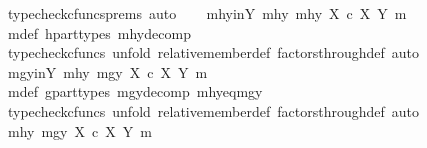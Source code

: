 \begin{isabellebody}
\ {\isacharparenleft}{\kern0pt}typecheck{\isacharunderscore}{\kern0pt}cfuncs{\isacharunderscore}{\kern0pt}prems{\isacharcomma}{\kern0pt}\ auto{\isacharparenright}{\kern0pt}\isanewline
\isanewline
\ \ \isamarkupfalse%
\ mhy{\isacharunderscore}{\kern0pt}in{\isacharunderscore}{\kern0pt}Y{\isacharcolon}{\kern0pt}\ {\isachardoublequoteopen}{\isasymlangle}mhy{}{\isacharcomma}{\kern0pt}\ mhy{}{\isasymrangle}\ {\isasymin}\isactrlbsub X\ {\isasymtimes}\isactrlsub c\ X\isactrlesub \ {\isacharparenleft}{\kern0pt}Y{\isacharcomma}{\kern0pt}\ m{\isacharparenright}{\kern0pt}{\isachardoublequoteclose}\isanewline
\ \ \ \ \isamarkupfalse%
\ m{\isacharunderscore}{\kern0pt}def\ h{\isacharunderscore}{\kern0pt}part{\isacharunderscore}{\kern0pt}types\ mhy{\isacharunderscore}{\kern0pt}decomp\isanewline
\ \ \ \ \isamarkupfalse%
\ {\isacharparenleft}{\kern0pt}typecheck{\isacharunderscore}{\kern0pt}cfuncs{\isacharcomma}{\kern0pt}\ unfold\ relative{\isacharunderscore}{\kern0pt}member{\isacharunderscore}{\kern0pt}def{}\ factors{\isacharunderscore}{\kern0pt}through{\isacharunderscore}{\kern0pt}def{}{\isacharcomma}{\kern0pt}\ auto{\isacharparenright}{\kern0pt}\isanewline
\ \ \isamarkupfalse%
\ mgy{\isacharunderscore}{\kern0pt}in{\isacharunderscore}{\kern0pt}Y{\isacharcolon}{\kern0pt}\ {\isachardoublequoteopen}{\isasymlangle}mhy{}{\isacharcomma}{\kern0pt}\ mgy{}{\isasymrangle}\ {\isasymin}\isactrlbsub X\ {\isasymtimes}\isactrlsub c\ X\isactrlesub \ {\isacharparenleft}{\kern0pt}Y{\isacharcomma}{\kern0pt}\ m{\isacharparenright}{\kern0pt}{\isachardoublequoteclose}\isanewline
\ \ \ \ \isamarkupfalse%
\ m{\isacharunderscore}{\kern0pt}def\ g{\isacharunderscore}{\kern0pt}part{\isacharunderscore}{\kern0pt}types\ mgy{\isacharunderscore}{\kern0pt}decomp\ mhy{}{\isacharunderscore}{\kern0pt}eq{\isacharunderscore}{\kern0pt}mgy{}\isanewline
\ \ \ \ \isamarkupfalse%
\ {\isacharparenleft}{\kern0pt}typecheck{\isacharunderscore}{\kern0pt}cfuncs{\isacharcomma}{\kern0pt}\ unfold\ relative{\isacharunderscore}{\kern0pt}member{\isacharunderscore}{\kern0pt}def{}\ factors{\isacharunderscore}{\kern0pt}through{\isacharunderscore}{\kern0pt}def{}{\isacharcomma}{\kern0pt}\ auto{\isacharparenright}{\kern0pt}\isanewline
\isanewline
\ \ \isamarkupfalse%
\ {\isachardoublequoteopen}{\isasymlangle}mhy{}{\isacharcomma}{\kern0pt}\ mgy{}{\isasymrangle}\ {\isasymin}\isactrlbsub X\ {\isasymtimes}\isactrlsub c\ X\isactrlesub \ {\isacharparenleft}{\kern0pt}Y{\isacharcomma}{\kern0pt}\ m{\isacharparenright}{\kern0pt}{\isachardoublequoteclose}\isanewline

\end{isabellebody}
